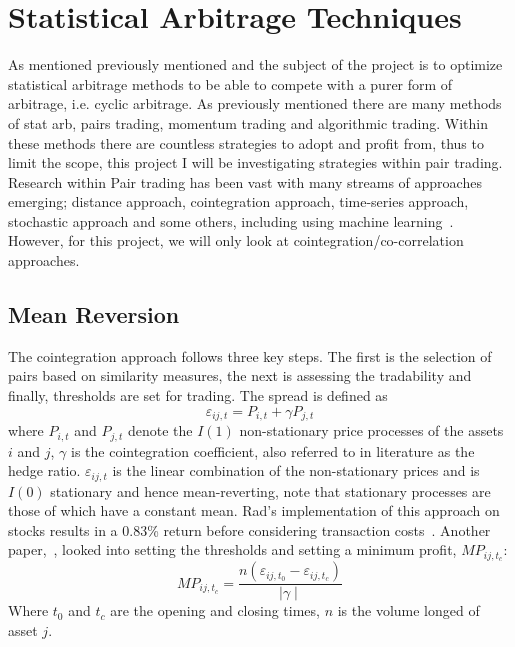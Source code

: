 \section{Statistical Arbitrage Techniques}
As mentioned previously mentioned and the subject of the project is to optimize statistical arbitrage methods to be able to compete with a purer form of arbitrage, i.e. cyclic arbitrage. As previously mentioned there are many methods of stat arb, pairs trading, momentum trading and algorithmic trading. Within these methods there are countless strategies to adopt and profit from, thus to limit the scope, this project I will be investigating strategies within pair trading. Research within Pair trading has been vast with many streams of approaches emerging; distance approach, cointegration approach, time-series approach, stochastic approach and some others, including using machine learning~\cite{https://doi.org/10.1111/joes.12153}. However, for this project, we will only look at cointegration/co-correlation approaches.

\subsection{Mean Reversion}
The cointegration approach follows three key steps. The first is the selection of pairs based on similarity measures, the next is assessing the tradability and finally, thresholds are set for trading. The spread is defined as $$\varepsilon_{i j,t} = P_{i,t} + \gamma P_{j,t}$$ where $P_{i,t}$ and $P_{j,t}$ denote the $I(1)$ non-stationary price processes of the assets $i$ and $j$, $\gamma$ is the cointegration coefficient, also referred to in literature as the hedge ratio. $\varepsilon_{i j,t}$ is the linear combination of the non-stationary prices and is $I(0)$ stationary and hence mean-reverting, note that stationary processes are those of which have a constant mean. Rad's implementation of this approach on stocks results in a 0.83\% return before considering transaction costs~\cite{RadLowFaff}. Another paper,~\cite{lossProtection}, looked into setting the thresholds and setting a minimum profit, $MP_{ij,t_c}$: $$MP_{ij,t_c} = \frac{n(\varepsilon_{i j,t_0} - \varepsilon_{i j,t_c})}{ \mid \gamma \mid}$$ Where $t_0$ and $t_c$ are the opening and closing times, $n$ is the volume longed of asset $j$.

